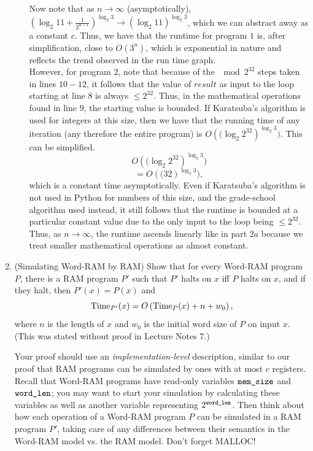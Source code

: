 \documentclass[11pt]{article}
\begin{document}
\begin{enumerate}
\begin{enumerate}
    Now note that as $n \to \infty$ (asymptotically), $\left(\log_2 11 + \frac{1}{2^{n-1}}\right)^{\log_2 3} \to (\log_2 11)^{\log_2 3}$, which we can abstract away as a constant $c$. Thus, we have that the runtime for program $1$ is, after simplification, close to $O(3^n)$, which is exponential in nature and reflects the trend observed in the run time graph. \\
    
    However, for program $2$, note that because of the $\mod 2^{32}$ steps taken in lines $10-12$, it follows that the value of $result$ as input to the loop starting at line $8$ is always $\leq 2^{32}$. Thus, in the mathematical operations found in line $9$, the starting value is bounded. If Karatsuba's algorithm is used for integers at this size, then we have that the running time of any iteration (any therefore the entire program) is $O\left((\log_2 2^{32}\right)^{\log_2 3})$. This can be simplified.
    $$
    O\left((\log_2 2^{32}\right)^{\log_2 3})
    $$
    $$
    = O\left((32\right)^{\log_2 3}),
    $$ which is a constant time asymptotically. Even if Karatsuba's algorithm is not used in Python for numbers of this size, and the grade-school algorithm used instead, it still follows that the runtime is bounded at a particular constant value due to the only input to the loop being $\leq 2^{32}$. Thus, as $n \to \infty$, the runtime ascends linearly like in part $2a$ because we treat smaller mathematical operations as almost constant.
\end{enumerate}

\item (Simulating Word-RAM by RAM)  Show that for every Word-RAM program $P$, there is a RAM program $P'$ such that $P'$ halts on $x$ iff $P$ halts on $x$, and if they halt, then  $P'(x)=P(x)$ and 
       $$\mathrm{Time}_{P'}(x) = O\left(\mathrm{Time}_P(x)+n+w_0\right),$$
where $n$ is the length of $x$ and $w_0$ is the initial word size of $P$ on input $x$.  (This was stated without proof in Lecture Notes 7.) 

Your proof should use an {\em implementation-level} description, similar to our proof that RAM programs can be simulated by ones with at most $c$ registers.  Recall that Word-RAM programs have read-only variables $\texttt{mem\_size}$ and $\texttt{word\_len}$; you may want to start your simulation by calculating these variables as well as another variable representing $2^{\texttt{word\_len}}$.  Then think about how each operation of a Word-RAM program $P$ can be simulated in a RAM program $P'$, taking care of any differences between their semantics in the Word-RAM model vs. the RAM model. Don't forget MALLOC! \\


\end{enumerate}
\end{document}
